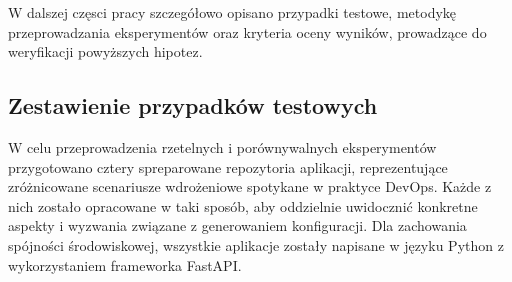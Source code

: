 \bigskip

W dalszej częsci pracy szczegółowo opisano przypadki testowe, metodykę przeprowadzania eksperymentów oraz kryteria oceny wyników, prowadzące do weryfikacji powyższych hipotez.

\subsection{Zestawienie przypadków testowych}

W celu przeprowadzenia rzetelnych i porównywalnych eksperymentów przygotowano cztery spreparowane repozytoria aplikacji, reprezentujące zróżnicowane scenariusze wdrożeniowe spotykane w praktyce DevOps. Każde z nich zostało opracowane w taki sposób, aby oddzielnie uwidocznić konkretne aspekty i wyzwania związane z generowaniem konfiguracji. Dla zachowania spójności środowiskowej, wszystkie aplikacje zostały napisane w języku Python z wykorzystaniem frameworka FastAPI.

